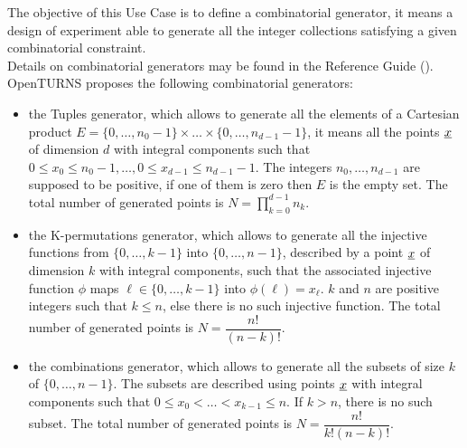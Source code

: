 \renewcommand{\filename}{docUC_MinMax_CombinatorialGenerators.tex}
\renewcommand{\filetitle}{UC: Creation of a combinatorial generator: subsets, injections, Cartesian products}

\HeaderIIILevel

\label{randomExpPlane}



The objective of this Use Case is to define a combinatorial generator, it means a design of experiment able to generate all the integer collections satisfying a given combinatorial constraint.\\


Details on combinatorial generators may be found in the Reference Guide ().\\

OpenTURNS proposes the following combinatorial generators:
\begin{itemize}
\item the Tuples generator, which allows to generate all the elements of a Cartesian product $E=\{0,\hdots,n_0-1\}\times\hdots\times\{0,\hdots,n_{d-1}-1\}$, it means all the points ${\underline{x}}$ of dimension $d$ with integral components such that $0\leq x_0\leq n_0-1,\hdots,0\leq x_{d-1} \leq n_{d-1}-1$. The integers $n_0,\hdots,n_{d-1}$ are supposed to be positive, if one of them is zero then $E$ is the empty set. The total number of generated points is $N=\prod_{k=0}^{d-1}n_k$.
\item the K-permutations generator, which allows to generate all the injective functions from $\{0,\hdots,k-1\}$ into $\{0,\hdots,n-1\}$, described by a point ${\underline{x}}$ of dimension $k$ with integral components, such that the associated injective function $\phi$ maps $\ell\in\{0,\hdots,k-1\}$ into $\phi(\ell)=x_{\ell}$. $k$ and $n$ are positive integers such that $k\leq n$, else there is no such injective function. The total number of generated points is $N=\dfrac{n!}{(n-k)!}$.
\item the combinations generator, which allows to generate all the subsets of size $k$ of $\{0,\hdots,n-1\}$. The subsets are described using points ${\underline{x}}$ with integral components such that $0\leq x_0<\hdots<x_{k-1}\leq n$. If $k>n$, there is no such subset. The total number of generated points is $N=\dfrac{n!}{k!(n-k)!}$.
\end{itemize}

